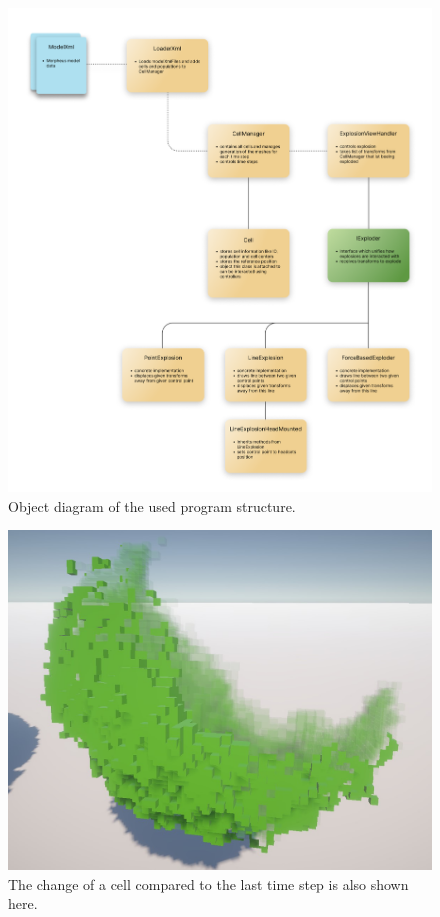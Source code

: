 \begin{figure}[h]
	\centering
	\includegraphics[width=1\linewidth]{fig/Images/objectDiagram}
	\caption[]{Object diagram of the used program structure. }
	\label{fig:objectDiagram}
\end{figure}

\begin{figure}[h]
	\centering
	\includegraphics[width=1\linewidth]{fig/Images/ChangeOfCellTranparent}
	\caption[]{The change of a cell compared to the last time step is also shown here. }
	\label{fig:ChangeOfCellTranparent}
\end{figure}


